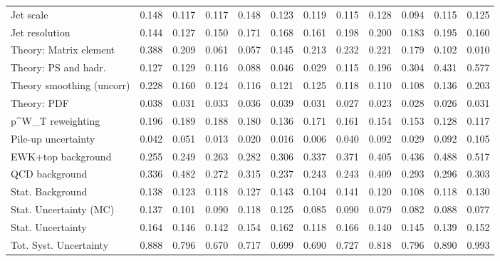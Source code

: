 \begin{tabular}{l|p{0.6cm}p{0.6cm}p{0.6cm}p{0.6cm}p{0.6cm}p{0.6cm}p{0.6cm}p{0.6cm}p{0.6cm}p{0.6cm}p{0.6cm}}
Jet scale                                & 0.148 & 0.117 & 0.117 & 0.148 & 0.123 & 0.119 & 0.115 & 0.128 & 0.094 & 0.115 & 0.125 \\
Jet resolution                           & 0.144 & 0.127 & 0.150 & 0.171 & 0.168 & 0.161 & 0.198 & 0.200 & 0.183 & 0.195 & 0.160 \\
Theory: Matrix element                   & 0.388 & 0.209 & 0.061 & 0.057 & 0.145 & 0.213 & 0.232 & 0.221 & 0.179 & 0.102 & 0.010 \\
Theory: PS and hadr.                     & 0.127 & 0.129 & 0.116 & 0.088 & 0.046 & 0.029 & 0.115 & 0.196 & 0.304 & 0.431 & 0.577 \\
Theory smoothing (uncorr)                & 0.228 & 0.160 & 0.124 & 0.116 & 0.121 & 0.125 & 0.118 & 0.110 & 0.108 & 0.136 & 0.203 \\
Theory: PDF                              & 0.038 & 0.031 & 0.033 & 0.036 & 0.039 & 0.031 & 0.027 & 0.023 & 0.028 & 0.026 & 0.031 \\
p^{W}_{T} reweighting                    & 0.196 & 0.189 & 0.188 & 0.180 & 0.136 & 0.171 & 0.161 & 0.154 & 0.153 & 0.128 & 0.117 \\
Pile-up uncertainty                      & 0.042 & 0.051 & 0.013 & 0.020 & 0.016 & 0.006 & 0.040 & 0.092 & 0.029 & 0.092 & 0.105 \\
EWK+top background                       & 0.255 & 0.249 & 0.263 & 0.282 & 0.306 & 0.337 & 0.371 & 0.405 & 0.436 & 0.488 & 0.517 \\
QCD background                           & 0.336 & 0.482 & 0.272 & 0.315 & 0.237 & 0.243 & 0.243 & 0.409 & 0.293 & 0.296 & 0.303 \\
Stat. Background                         & 0.138 & 0.123 & 0.118 & 0.127 & 0.143 & 0.104 & 0.141 & 0.120 & 0.108 & 0.118 & 0.130 \\
Stat. Uncertainty (MC)                   & 0.137 & 0.101 & 0.090 & 0.118 & 0.125 & 0.085 & 0.090 & 0.079 & 0.082 & 0.088 & 0.077 \\
\hline
Stat. Uncertainty                        & 0.164 & 0.146 & 0.142 & 0.154 & 0.162 & 0.118 & 0.166 & 0.140 & 0.145 & 0.139 & 0.152 \\
\hline
Tot. Syst. Uncertainty                   & 0.888 & 0.796 & 0.670 & 0.717 & 0.699 & 0.690 & 0.727 & 0.818 & 0.796 & 0.890 & 0.993 \\
\hline
\end{tabular}

